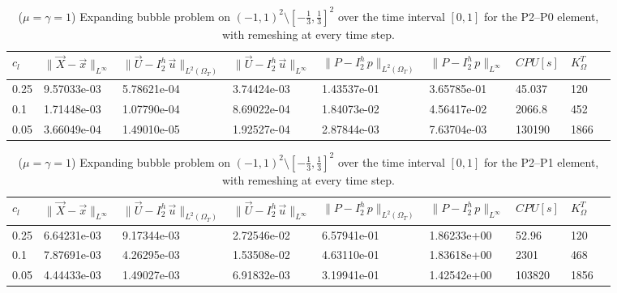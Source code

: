 \documentclass[a4paper,12pt,onecolumn]{article}
\newcommand{\errorXx}{\|\vec{X} - \vec{x}\|_{L^\infty}}
\newcommand{\LerrorUu}[1]{\|\vec U - I^h_{#1}\,\vec u\|_{L^2(\Omega_T)}}
\newcommand{\errorUu}[1]{\|\vec U - I^h_{#1}\,\vec u\|_{L^\infty}}
\newcommand{\errorPp}[1]{\|P - I^h_{#1}\,p\|_{L^\infty}}
\newcommand{\LerrorPp}[1]{\|P - I^h_{#1}\,p\|_{L^2(\Omega_T)}}
\begin{document}
\begin{table}
 \center
 \hspace*{-2cm}
\begin{tabular}{lllllllll}
\hline
$c_l$ & $\errorXx$ & $\LerrorUu2$ & $\errorUu2$ & $\LerrorPp2$ & $\errorPp2$ & $CPU[s]$ & $K_\Omega^T$\\
\hline
0.25 & 9.57033e-03 & 5.78621e-04 & 3.74424e-03 & 1.43537e-01 & 3.65785e-01 & 45.037 & 120\\
0.1 &  1.71448e-03 & 1.07790e-04 & 8.69022e-04 & 1.84073e-02 & 4.56417e-02 & 2066.8 & 452\\
0.05 & 3.66049e-04 & 1.49010e-05 & 1.92527e-04 & 2.87844e-03 & 7.63704e-03 & 130190 & 1866\\ 
\hline
\end{tabular}
\hspace*{-2cm}
\caption{($\mu=\gamma=1$) Expanding bubble problem on $(-1,1)^2\setminus[-\frac{1}{3},\frac{1}{3}]^2$ over the time interval $[0,1]$ for the P2--P0 element, with remeshing at every time step.}
\label{tab:expandingbubble2Dp2p0remesh}
\end{table}

\begin{table}
 \center
 \hspace*{-2cm}
\begin{tabular}{lllllllll}
\hline
$c_l$ & $\errorXx$ & $\LerrorUu2$ & $\errorUu2$ & $\LerrorPp2$ & $\errorPp2$ & $CPU[s]$ & $K_\Omega^T$\\
\hline
0.25 &  6.64231e-03 & 9.17344e-03 & 2.72546e-02 & 6.57941e-01 & 1.86233e+00 & 52.96 & 120\\
0.1 & 7.87691e-03 & 4.26295e-03 & 1.53508e-02 & 4.63110e-01 & 1.83618e+00 & 2301 & 468\\
0.05 & 4.44433e-03 & 1.49027e-03 & 6.91832e-03 & 3.19941e-01 & 1.42542e+00 & 103820 & 1856\\
\hline
\end{tabular}
\hspace*{-2cm}
\caption{($\mu=\gamma=1$) Expanding bubble problem on $(-1,1)^2\setminus[-\frac{1}{3},\frac{1}{3}]^2$ over the time interval $[0,1]$ for the P2--P1 element, with remeshing at every time step.}
\label{tab:expandingbubble2Dp2p1remesh}
\end{table}
\end{document}

